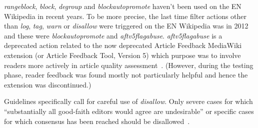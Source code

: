 \emph{rangeblock}, \emph{block}, \emph{degroup} and \emph{blockautopromote} haven't been used on the EN Wikipedia in recent years. %
To be more precise, the last time filter actions other than \emph{log}, \emph{tag}, \emph{warn} or \emph{disallow} were triggered on the EN Wikipedia was in 2012 and these were \emph{blockautopromote} and \emph{aftv5flagabuse}. %
\emph{aftv5flagabuse} is a deprecated action related to the now deprecated Article Feedback MediaWiki extension (or Article Feedback Tool, Version 5) which purpose was to involve readers more actively in article quality assessment~\cite{Wikipedia:ArticleFeedback}.
(However, during the testing phase, reader feedback was found mostly not particularly helpful and hence the extension was discontinued.)

Guidelines specifically call for careful use of \emph{disallow}.
Only severe cases for which ``substantially all good-faith editors would agree are undesirable'' or specific cases for which consensus has been reached should be disallowed~\cite{Wikipedia:EditFilter}.

